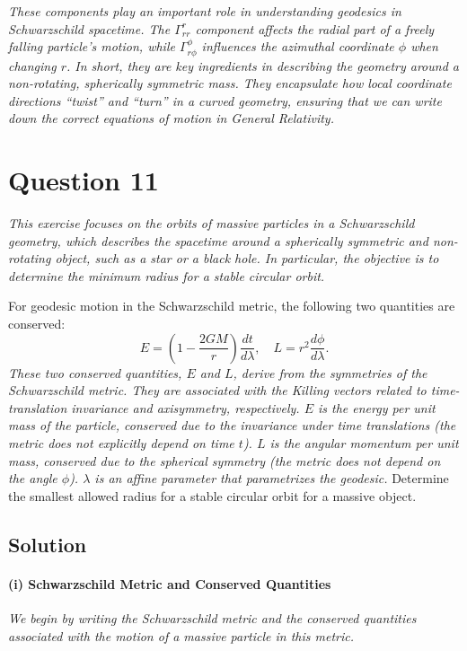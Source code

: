 \emph{These components play an important role in understanding geodesics in Schwarzschild spacetime. The \(\Gamma^r_{rr}\) component affects the radial part of a freely falling particle’s motion, while \(\Gamma^\phi_{r\phi}\) influences the azimuthal coordinate \(\phi\) when changing \(r\). In short, they are key ingredients in describing the geometry around a non-rotating, spherically symmetric mass. They encapsulate how local coordinate directions ``twist'' and ``turn'' in a curved geometry, ensuring that we can write down the correct equations of motion in General Relativity.}


\pagebreak

\section*{Question 11}

\textit{This exercise focuses on the orbits of massive particles in a Schwarzschild geometry, which describes the spacetime around a spherically symmetric and non-rotating object, such as a star or a black hole. In particular, the objective is to determine the minimum radius for a stable circular orbit.}

For geodesic motion in the Schwarzschild metric, the following two quantities are conserved:
\[
E = \left(1 - \frac{2GM}{r}\right) \frac{dt}{d\lambda}, 
\quad
L = r^{2} \frac{d\phi}{d\lambda}.
\]
\textit{These two conserved quantities, \(E\) and \(L\), derive from the symmetries of the Schwarzschild metric. They are associated with the Killing vectors related to time-translation invariance and axisymmetry, respectively. \(E\) is the energy per unit mass of the particle, conserved due to the invariance under time translations (the metric does not explicitly depend on time \(t\)). \(L\) is the angular momentum per unit mass, conserved due to the spherical symmetry (the metric does not depend on the angle \(\phi\)). \(\lambda\) is an affine parameter that parametrizes the geodesic.}
Determine the smallest allowed radius for a stable circular orbit for a massive object.

\subsection*{Solution}

\paragraph{(i) Schwarzschild Metric and Conserved Quantities}
\textit{We begin by writing the Schwarzschild metric and the conserved quantities associated with the motion of a massive particle in this metric.}

